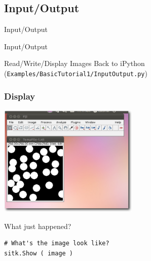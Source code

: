 \subsection{Input/Output}

\begin{frame}{Input/Output}
\fontsize{36pt}{36pt}\selectfont
\center
\begin{center}
Input/Output
\end{center}
\end{frame}

\begin{frame}{Read/Write/Display Images}
Back to iPython (\texttt{Examples/BasicTutorial1/InputOutput.py})
\end{frame}

\begin{frame}[fragile]
\frametitle{Display}
\begin{center}
  \includegraphics[width=0.5\textwidth]{Images/ImageDisplay_shadow}
\end{center}

What just happened?
\lstpython
\begin{lstlisting}
# What's the image look like?
sitk.Show ( image )
\end{lstlisting}
\end{frame}

